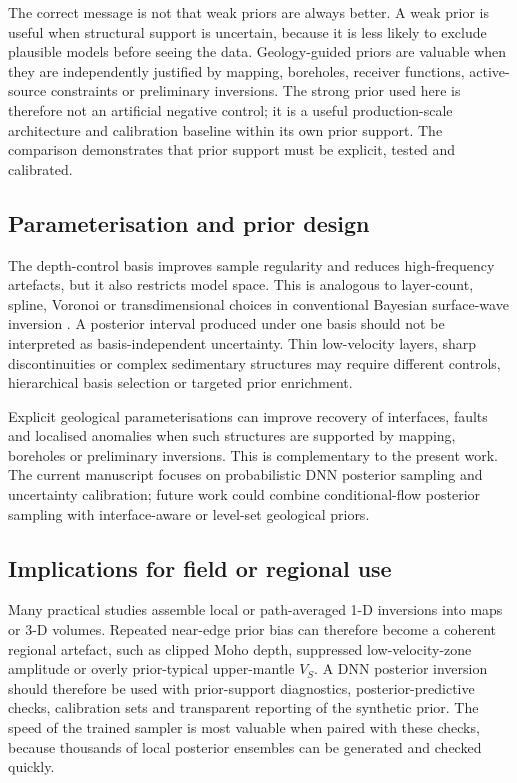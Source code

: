 \documentclass[referee]{gji}
\begin{document}
The correct message is not that weak priors are always better. A weak prior is useful when structural support is uncertain, because it is less likely to exclude plausible models before seeing the data. Geology-guided priors are valuable when they are independently justified by mapping, boreholes, receiver functions, active-source constraints or preliminary inversions. The strong prior used here is therefore not an artificial negative control; it is a useful production-scale architecture and calibration baseline within its own prior support. The comparison demonstrates that prior support must be explicit, tested and calibrated.

\subsection{Parameterisation and prior design}

The depth-control basis improves sample regularity and reduces high-frequency artefacts, but it also restricts model space. This is analogous to layer-count, spline, Voronoi or transdimensional choices in conventional Bayesian surface-wave inversion \citep{GaoLekic2018}. A posterior interval produced under one basis should not be interpreted as basis-independent uncertainty. Thin low-velocity layers, sharp discontinuities or complex sedimentary structures may require different controls, hierarchical basis selection or targeted prior enrichment.

Explicit geological parameterisations can improve recovery of interfaces, faults and localised anomalies when such structures are supported by mapping, boreholes or preliminary inversions. This is complementary to the present work. The current manuscript focuses on probabilistic DNN posterior sampling and uncertainty calibration; future work could combine conditional-flow posterior sampling with interface-aware or level-set geological priors.

\subsection{Implications for field or regional use}

Many practical studies assemble local or path-averaged 1-D inversions into maps or 3-D volumes. Repeated near-edge prior bias can therefore become a coherent regional artefact, such as clipped Moho depth, suppressed low-velocity-zone amplitude or overly prior-typical upper-mantle $V_S$. A DNN posterior inversion should therefore be used with prior-support diagnostics, posterior-predictive checks, calibration sets and transparent reporting of the synthetic prior. The speed of the trained sampler is most valuable when paired with these checks, because thousands of local posterior ensembles can be generated and checked quickly.
\end{document}
